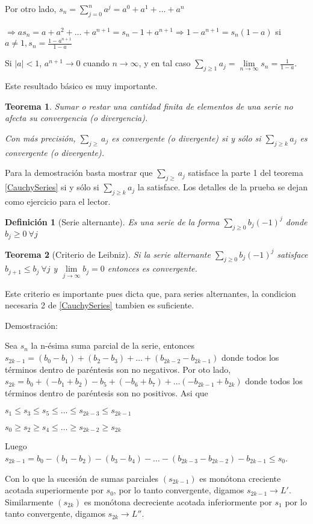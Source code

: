 \documentclass[12pt]{book}
\providecommand{\abs}[1]{\lvert#1\rvert}
\newtheorem{teo}{Teorema}[section]
\newtheorem{defi}{Definición}[section]
\begin{document}
Por otro lado, $s_n=\sum_{j=0}^na^j=a^0+a^1+\dots+a^n$

$\Rightarrow as_n=a+a^2+\dots+a^{n+1}=s_n-1+a^{n+1} \Rightarrow 1-a^{n+1}=s_n(1-a)$ si $a\neq1, s_n=\frac{1-a^{n+1}}{1-a}$

Si $\abs{a}<1$, $a^{n+1} \rightarrow 0$ cuando $n \rightarrow \infty$, y en tal caso $\sum_{j \ge 1} a_j = \lim\limits_{n \to \infty}s_n = \frac{1}{1-a}$.

Este resultado básico es muy importante.
\begin{teo}\label{SumRestPosNega}\rm
Sumar o restar una cantidad finita de elementos de una serie no afecta su convergencia (o divergencia).

Con más precisión, $\sum_{j \ge }a_j$ es convergente (o divergente) si y sólo si $\sum_{j \ge k} a_j$ es convergente (o divergente).
\end{teo}
Para la demostración basta mostrar que $\sum_{j \ge }a_j$ satisface la parte 1 del teorema \ref{CauchySeries} si y sólo si $\sum_{j \ge k} a_j$ la satisface. Los detalles de la prueba se dejan como ejercicio para el lector.
\begin{defi}[Serie alternante]\rm
Es una serie de la forma $\sum_{j \ge 0} b_j(-1)^j$ donde $b_j \ge 0 \ \forall{j}$
\end{defi}
\begin{teo}[Criterio de Leibniz]\rm
Si la serie alternante $\sum_{j \ge 0} b_j(-1)^j$ satisface $b_{j+1} \le b_j \ \forall{j}$ y $\lim\limits_{j \to \infty}b_j=0$ entonces es convergente.
\end{teo}
Este criterio es importante pues dicta que, para series alternantes, la condicion necesaria 2 de \ref{CauchySeries} tambien es suficiente.

Demostración:

Sea $s_n$ la n-ésima suma parcial de la serie, entonces $s_{2k-1}=(b_0-b_1)+(b_2-b_3)+\dots+(b_{2k-2}-b_{2k-1})$ donde todos los términos dentro de paréntesis son no negativos. Por oto lado, $s_{2k}=b_0+(-b_1+b_2)-b_5+(-b_6+b_7)+\dots(-b_{2k-1}+b_{2k})$ donde todos los términos dentro de paréntesis son no positivos. Asi que 

$s_1 \le s_3 \le s_5 \le \dots \le s_{2k-3} \le s_{2k-1}$

$s_0 \ge s_2 \ge s_4 \le \dots \ge s_{2k-2} \ge s_{2k}$

Luego $s_{2k-1}=b_0-(b_1-b_2)-(b_3-b_4)-\dots-(b_{2k-3}-b_{2k-2})-b_{2k-1} \le s_0$.

Con lo que la sucesión de sumas parciales $(s_{2k-1})$ es monótona creciente acotada superiormente por $s_0$, por lo tanto convergente, digamos $s_{2k-1} \rightarrow L'$. Similarmente $(s_{2k})$ es monótona decreciente acotada inferiormente por $s_1$ por lo tanto convergente, digamos $s_{2k} \rightarrow L''$.
\end{document}
